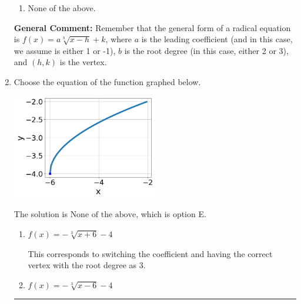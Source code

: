 \documentclass{extbook}[14pt]
\newcommand{\litem}[1]{\item #1

\rule{\textwidth}{0.4pt}}
\begin{document}
\begin{enumerate}
{\begin{enumerate}[label=\Alph*.]
\item None of the above.\end{enumerate}
\textbf{General Comment:} Remember that the general form of a radical equation is $ f(x) = a \sqrt[b]{x - h} + k $, where $a$ is the leading coefficient (and in this case, we assume is either 1 or -1), $b$ is the root degree (in this case, either 2 or 3), and $(h, k)$ is the vertex.
}
\litem{
Choose the equation of the function graphed below.

\begin{center}
    \includegraphics[width=0.5\textwidth]{../Figures/radicalGraphToEquationCopyB.png}
\end{center}



The solution is \( \text{None of the above} \), which is option E.\begin{enumerate}[label=\Alph*.]
\item \( f(x) = - \sqrt[3]{x + 6} - 4 \)

This corresponds to switching the coefficient and having the correct vertex with the root degree as $3$.
\item \( f(x) = - \sqrt[3]{x - 6} - 4 \)


\end{enumerate}}
\end{enumerate}
\end{document}
